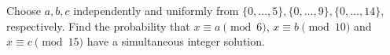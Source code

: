 Choose $a,b,c$ independently and uniformly from $\{0,\ldots,5\},\{0,\ldots,9\},\{0,\ldots,14\}$, respectively. Find the probability that $x\equiv a\pmod6$, $x\equiv b\pmod{10}$ and $x\equiv c\pmod{15}$ have a simultaneous integer solution.

